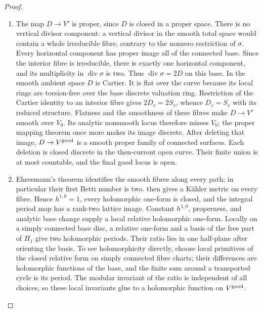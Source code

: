 \begin{proof}
\begin{enumerate}[label=\arabic*.,leftmargin=*]
\item The map \(D\to V'\) is proper, since \(D\) is closed in a proper
space. There is no vertical divisor component: a vertical divisor in
the smooth total space would contain a whole irreducible fibre,
contrary to the nonzero restriction of \(\sigma\). Every horizontal
component has proper image all of the connected base. Since the
interior fibre is irreducible, there is exactly one horizontal
component, and its multiplicity in \(\operatorname{div}\sigma\) is
two. Thus \(\operatorname{div}\sigma=2D\) on this base. In the smooth
ambient space \(D\) is Cartier. It is flat over the curve because
its local rings are torsion-free over the base discrete valuation
ring. Restriction of the Cartier identity to an interior fibre gives
\(2D_v=2S_v\), whence \(D_v=S_v\) with its reduced structure.
Flatness and the smoothness of these fibres make \(D\to V'\) smooth
over \(V_0\). Its analytic nonsmooth locus therefore misses \(V_0\);
the proper mapping theorem once more makes its image discrete.
After deleting that image, \(D\to V^{\rm good}\) is a smooth proper
family of connected surfaces. Each deletion is closed discrete in the
then-current open curve. Their finite union is at most countable,
and the final good locus is open.

\item Ehresmann's theorem identifies the smooth fibres along every path;
in particular their first Betti number is two. \cite[Theorem~11, p.~297]{Buchdahl1999} then gives a K\"ahler metric on every fibre. Hence
\(h^{1,0}=1\), every holomorphic one-form is closed, and the integral
period map has a rank-two lattice image. Constant \(h^{1,0}\),
properness, and analytic base change supply a local relative
holomorphic one-form. Locally on a simply connected
base disc, a relative one-form and a basis of the free part of
\(H_1\) give two holomorphic periods. Their ratio lies in one
half-plane after orienting the basis. To see holomorphicity directly,
choose local primitives of the closed relative form on simply
connected fibre charts; their differences are holomorphic functions
of the base, and the finite sum around a transported cycle is its
period. The modular invariant of the ratio is independent of all
choices, so these local invariants glue to a holomorphic function on
\(V^{\rm good}\).
\end{enumerate}
\end{proof}
